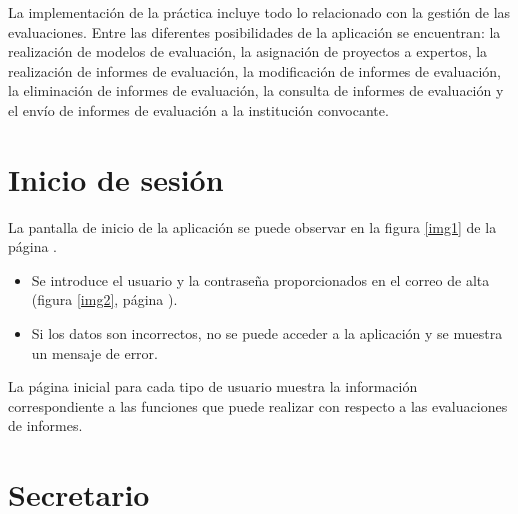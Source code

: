 \documentclass[11pt,a4paper,spanish,twoside]{book}
\begin{document}
La implementación de la práctica incluye todo lo relacionado con la gestión de
las e\-va\-lua\-cio\-nes. Entre las diferentes posibilidades de la aplicación se
encuentran: la realización de modelos de evaluación, la asignación de proyectos
a expertos, la realización de informes de evaluación, la modificación de
informes de evaluación, la eliminación de informes de evaluación, la consulta
de informes de evaluación y el envío de informes de evaluación a la institución
convocante. 

\section{Inicio de sesión}
La pantalla de inicio de la aplicación se puede observar en la figura
\ref{img1} de la página \pageref{img1}.


\begin{itemize}
\item Se introduce el usuario y la contraseña proporcionados en el correo de 
alta (figura \ref{img2}, página \pageref{img2}).


\item Si los datos son incorrectos, no se puede acceder a la aplicación y se
  muestra un mensaje de error. 
\end{itemize}

La página inicial para cada tipo de usuario muestra la información 
co\-rres\-pon\-dien\-te a las funciones que puede realizar con respecto a las 
evaluaciones de informes.


\section{Secretario}
\end{document}
